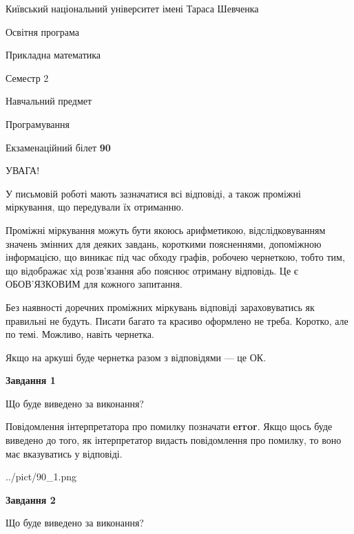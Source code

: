 \documentclass[12pt, ukrainian]{article}
\begin{document}
{{\begin {small}\par
{ \center  Київський національний університет імені Тараса Шевченка \par}
{\parbox {5 cm}{Освітня програма \hfill}{\parbox {7 cm}{Прикладна математика \hfill}}\parbox {6 cm}{\hfill Семестр 2}}\par
{\parbox {5 cm} {Навчальний предмет \hfill}\parbox {7 cm}{Програмування \hfill}\parbox {6cm}{\hfill}\par}\vspace{-7pt} \end{small}}{\center Екзаменаційний білет \No \textbf
{ 90 }\par}}
{
\begin {large}
УВАГА!

У письмовій роботі мають зазначатися всі відповіді, а також проміжні міркування, що передували їх отриманню.

Проміжні міркування можуть бути якоюсь арифметикою, відслідковуванням зна\-чень змінних для деяких завдань,
короткими поясненнями, допоміжною інформацією, що виникає під час обходу графів, робочею чернеткою,
тобто тим, що відображає хід розв’язання або пояснює отриману відповідь.
Це є ОБОВ’ЯЗКОВИМ для кожного запитання.

Без наявності доречних проміжних міркувань відповіді зараховуватись як правиль\-ні не будуть.
Писати багато та красиво оформлено не треба. Коротко, але по темі. Можли\-во, навіть чернетка.

Якщо на аркуші буде чернетка разом з відповідями --- це ОК.

\newpage

{\begin {center}\textbf{Завдання 1}\end {center}}\par
Що буде виведено за виконання?

Повідомлення інтерпретатора про помилку позначати \textbf{error}.
Якщо щось буде виведено до того, як інтерпретатор видасть повідомлення про помилку, 
то воно має вказуватись у відповіді. \par


\begin{center}
	{../pict/90_1.png}
\end{center}
\newpage

{\begin {center}\textbf{Завдання 2}\end {center}}\par
Що буде виведено за виконання?


\end{large}}
\end{document}
